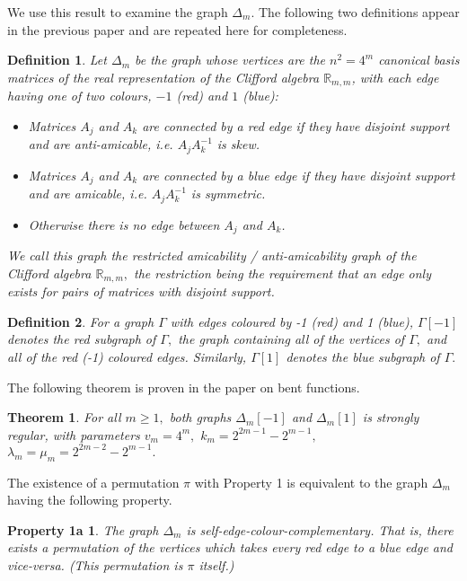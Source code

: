\documentclass[12pt,a4paper]{article}
\newcommand{\mb}[1]{\mathbb{#1}}
\newcommand{\R}{\mb{R}}
\newtheorem*{theorem}{Theorem}
\newtheorem*{definition}{Definition}
\newtheorem*{propertyonea}{Property 1a}
\begin{document}
We use this result to examine the graph $\varDelta_m.$
The following two definitions appear in the previous paper \cite{Leo14Constructions}
and are repeated here for completeness.
\begin{definition}\label{definition-delta}
Let $\varDelta_m$ be the graph whose vertices are the $n^2=4^m$ 
canonical basis matrices of the real representation
of the Clifford algebra $\R_{m,m}$,
with each edge having one of two colours, $-1$ (red) and $1$ (blue):
\begin{itemize}
\item 
Matrices $A_j$ and $A_k$ are connected by a red edge if they have disjoint support and are anti-amicable,
i.e. $A_j A_k^{-1}$ is skew.
\item 
Matrices $A_j$ and $A_k$ are connected by a blue edge if they have disjoint support and are amicable,
i.e. $A_j A_k^{-1}$ is symmetric.
\item 
Otherwise there is no edge between $A_j$ and $A_k$.
\end{itemize}
We call this graph the \emph{restricted amicability / anti-amicability graph}
of the Clifford algebra $\R_{m,m},$
the restriction being the requirement that an edge only exists for pairs of matrices with disjoint support.
\end{definition}

\begin{definition}\label{definition-red-subgraph}
For a graph $\Gamma$ with edges coloured by -1 (red) and 1 (blue),
$\Gamma[-1]$ denotes the \emph{red subgraph} of $\Gamma,$
the graph containing all of the vertices of $\Gamma,$ and all of the red (-1) coloured edges.
Similarly, $\Gamma[1]$ denotes the \emph{blue subgraph} of $\Gamma.$
\end{definition}

The following theorem is proven in the paper on bent functions\cite{Leo15Bent}.

\begin{theorem}\label{theorem-twins-are-strongly-regular}
%
For all $m \geqslant 1,$
both graphs $\varDelta_m[-1]$ and $\varDelta_m[1]$ is strongly regular, with parameters
$v_m = 4^m,$ $k_m = 2^{2 m - 1} - 2^{m - 1},$ $\lambda_m=\mu_m=2^{2 m - 2} - 2^{m - 1}.$
%
\end{theorem}

The existence of a permutation $\pi$ with Property 1 is equivalent to the graph $\varDelta_m$
having the following property.

\begin{propertyonea}
The graph $\varDelta_m$ is self-edge-colour-complementary.
That is, there exists a permutation of the vertices which takes every red edge to a blue edge and vice-versa.
(This permutation is $\pi$ itself.) 
\end{propertyonea}
\end{document}
